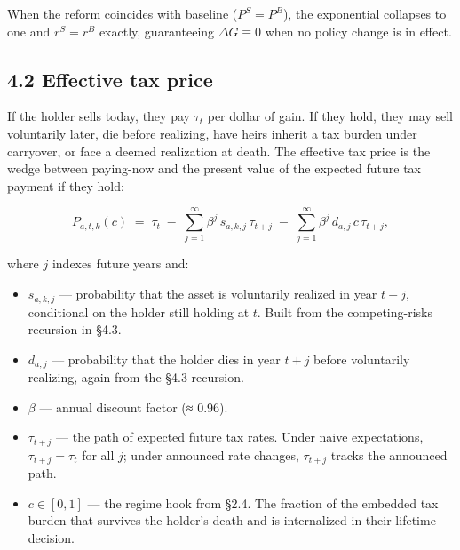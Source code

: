 \documentclass[11pt]{article}
\begin{document}
When the reform coincides with baseline ($P^S = P^B$), the exponential collapses to one and $r^S = r^B$ exactly, guaranteeing $\Delta G \equiv 0$ when no policy change is in effect.

\subsection*{4.2 Effective tax price}

If the holder sells today, they pay $\tau_t$ per dollar of gain. If they hold, they may sell voluntarily later, die before realizing, have heirs inherit a tax burden under carryover, or face a deemed realization at death. The effective tax price is the wedge between paying-now and the present value of the expected future tax payment if they hold:

\[
\boxed{
P_{a,t,k}(c)
\;=\;
\tau_t
\;-\;
\sum_{j=1}^{\infty}
\beta^j\, s_{a,k,j}\, \tau_{t+j}
\;-\;
\sum_{j=1}^{\infty}
\beta^j\, d_{a,j}\, c\, \tau_{t+j},
}
\]

where $j$ indexes future years and:

\begin{itemize}
  \item $s_{a,k,j}$ — probability that the asset is voluntarily realized in year
    $t+j$, conditional on the holder still holding at $t$. Built from the
    competing-risks recursion in §4.3.
\end{itemize}
\begin{itemize}
  \item $d_{a,j}$ — probability that the holder dies in year $t+j$ before
    voluntarily realizing, again from the §4.3 recursion.
\end{itemize}
\begin{itemize}
  \item $\beta$ — annual discount factor (≈ 0.96).
\end{itemize}
\begin{itemize}
  \item $\tau_{t+j}$ — the path of expected future tax rates. Under naive
    expectations, $\tau_{t+j} = \tau_t$ for all $j$; under announced rate
    changes, $\tau_{t+j}$ tracks the announced path.
\end{itemize}
\begin{itemize}
  \item $c \in [0, 1]$ — the regime hook from §2.4. The fraction of the
    embedded tax burden that survives the holder's death and is internalized
    in their lifetime decision.
\end{itemize}
\end{document}
